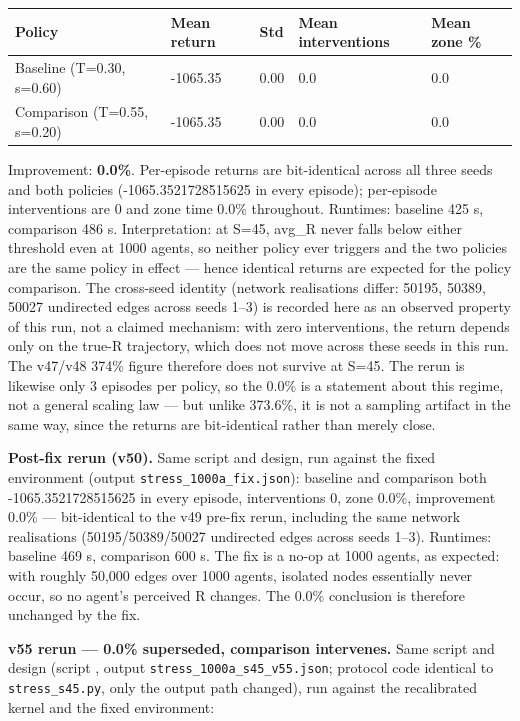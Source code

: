 \documentclass[11pt]{article}
\begin{document}
\begin{table}[htbp]
\centering
\begin{tabular}{lllll}
\toprule
\textbf{Policy} & \textbf{Mean return} & \textbf{Std} & \textbf{Mean interventions} & \textbf{Mean zone \%} \\
\midrule
Baseline (T=0.30, s=0.60) & -1065.35 & 0.00 & 0.0 & 0.0 \\
Comparison (T=0.55, s=0.20) & -1065.35 & 0.00 & 0.0 & 0.0 \\
\bottomrule
\end{tabular}
\end{table}

Improvement: \textbf{0.0\%}. Per-episode returns are bit-identical across all three seeds and both policies (-1065.3521728515625 in every episode); per-episode interventions are 0 and zone time 0.0\% throughout. Runtimes: baseline 425 s, comparison 486 s. Interpretation: at S=45, avg\_R never falls below either threshold even at 1000 agents, so neither policy ever triggers and the two policies are the same policy in effect --- hence identical returns are expected for the policy comparison. The cross-seed identity (network realisations differ: 50195, 50389, 50027 undirected edges across seeds 1--3) is recorded here as an observed property of this run, not a claimed mechanism: with zero interventions, the return depends only on the true-R trajectory, which does not move across these seeds in this run. The v47/v48 374\% figure therefore does not survive at S=45. The rerun is likewise only 3 episodes per policy, so the 0.0\% is a statement about this regime, not a general scaling law --- but unlike 373.6\%, it is not a sampling artifact in the same way, since the returns are bit-identical rather than merely close.

\textbf{Post-fix rerun (v50).} Same script and design, run against the fixed environment (output \texttt{stress\_1000a\_fix.json}): baseline and comparison both -1065.3521728515625 in every episode, interventions 0, zone 0.0\%, improvement 0.0\% --- bit-identical to the v49 pre-fix rerun, including the same network realisations (50195/50389/50027 undirected edges across seeds 1--3). Runtimes: baseline 469 s, comparison 600 s. The fix is a no-op at 1000 agents, as expected: with roughly 50,000 edges over 1000 agents, isolated nodes essentially never occur, so no agent's perceived R changes. The 0.0\% conclusion is therefore unchanged by the fix.

\textbf{v55 rerun --- 0.0\% superseded, comparison intervenes.} Same script and design (script , output \texttt{stress\_1000a\_s45\_v55.json}; protocol code identical to \texttt{stress\_s45.py}, only the output path changed), run against the recalibrated kernel and the fixed environment:
\end{document}
